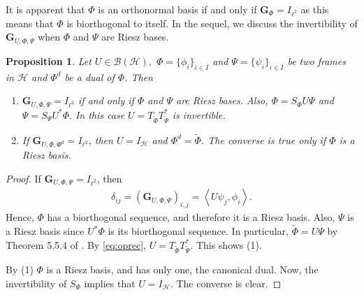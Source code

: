 \documentclass{birkjour}
\newtheorem{prop}[thm]{Proposition}
\theoremstyle{definition}
\theoremstyle{remark}
\numberwithin{equation}{section}
\def\Hil{\mathcal{H}}
\newcommand{\BL}[1]{
{\mathcal B} \left( #1 \right)
}
\begin{document}
It is apparent that $\Phi$ is an orthonormal basis if and only if $\mathbf{G}_{\Phi}=I_{\ell^{2}}$ as this means that $\Phi$ is biorthogonal to itself.
In the sequel, we discuss the invertibility of $\mathbf{G}_{U,\Phi,\Psi}$ when $\Phi$ and $\Psi$ are Riesz bases.
\begin{prop}
Let $U\in \BL{\Hil},$ $\Phi=\{\phi_{i}\}_{i\in I}$ and $\Psi=\{\psi_{i}\}_{i\in I}$ be two frames in $\mathcal{H}$ and $\Phi^d$ be a dual of $\Phi$. Then
\begin{enumerate}
\item[(1)]  $\mathbf{G}_{U,\Phi,\Psi}=I_{\ell^{2}}$ if and only if $\Phi$ and $\Psi$ are
 Riesz bases. Also, $\Phi=S_{\Phi}U\Psi$ and $\Psi=S_{\Psi}U^*\Phi.$
 In this case $U=T_{\widetilde{\Phi}} T_{\widetilde{\Psi}}^*$ is invertible. 
\item[(2)]  If $\mathbf{G}_{U,\Phi,\Phi^d}=I_{\ell^{2}}$, then $U=I_{\mathcal{H}}$ and $\Phi^d=\widetilde{\Phi}$. The converse is true only if $\Phi$ is a Riesz basis.
\end{enumerate}
\end{prop}

\begin{proof}
If $\mathbf{G}_{U,\Phi,\Psi}=I_{\ell^{2}}$, then
\begin{eqnarray*}
\delta_{ij}=\left(\mathbf{G}_{U,\Phi,\Psi}\right)_{i,j}=\left\langle U\psi_{j},\phi_{i}\right\rangle.
\end{eqnarray*}
Hence, $\Phi$ has a biorthogonal sequence, and therefore it is a
Riesz basis. Also, $\Psi$ is a Riesz basis since $U^{*}\Phi$ is
its biorthogonal sequence. In particular, $\widetilde{\Phi}=U\Psi$
by Theorem 5.5.4 of \cite{Chr08}. By \eqref{eq:oprec}, $
U=T_{\widetilde\Phi}T_{\widetilde\Psi}^*.$ This shows (1).

 By (1) $\Phi$ is a Riesz basis, and has only one, the canonical dual.
Now, the invertibility of  $S_{\Phi}$ implies that $U=I_{\mathcal{H}}$. The converse is clear.
\end{proof}
\end{document}
